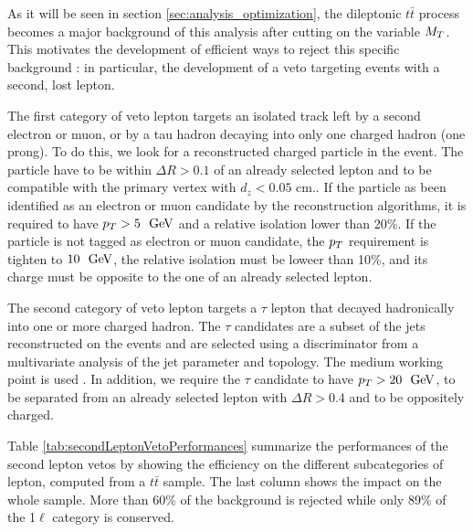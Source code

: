         As it will be seen in section \ref{sec:analysis_optimization}, the dileptonic $t\bar{t}$ process becomes a major
        background of this analysis after cutting on the variable $M_T$. This motivates the development of efficient ways
        to reject this specific background : in particular, the development of a veto targeting events with a second, lost 
        lepton.

        The first category of veto lepton targets an isolated track left by a second electron or muon, or by a tau hadron
        decaying into only one charged hadron (one prong). To do this, we look for a reconstructed charged particle in the
        event. The particle have to be within $\Delta R > 0.1$ of an already selected lepton and to be compatible with the
        primary vertex with $d_z < 0.05$ cm.. If the particle as been identified as an electron or muon candidate by the 
        reconstruction algorithms, it is required to have $p_T > 5~~\text{GeV}$ and a relative isolation lower than 20\%. If the
        particle is not tagged as electron or muon candidate, the $p_T$ requirement is tighten to $10~~\text{GeV}$, the relative
        isolation must be loweer than 10\%, and its charge must be opposite to the one of an already selected lepton.

        The second category of veto lepton targets a $\tau$ lepton that decayed hadronically into one or more charged hadron.
        The $\tau$ candidates are a subset of the jets reconstructed on the events and are selected using a discriminator
        from a multivariate analysis of the jet parameter and topology. The medium working point is used .
        In addition, we require the $\tau$ candidate to have $p_T > 20~~\text{GeV}$, to be separated from an already selected
        lepton with $\Delta R > 0.4$ and to be oppositely charged. 

        Table \ref{tab:secondLeptonVetoPerformances} summarize the performances of the second lepton vetos by showing the
        efficiency on the different subcategories of lepton, computed from a $t\bar{t}$ sample. The last column shows the
        impact on the whole sample. More than 60\% of the background is rejected while only 89\% of the 1$\ell$ category is
        conserved.


